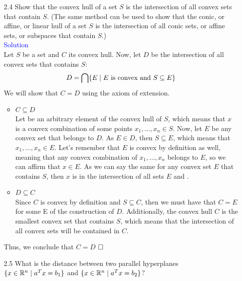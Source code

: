 \documentclass[12pt, oneside]{article}%
\def\R{{\mathbb R}}
\begin{document}
\begin{enumerate}[font=\bfseries]
\item [2.4] Show that the convex hull of a set $S$ is the intersection of all convex sets that contain $S$. (The same method can be used to show that the conic, or affine, or linear hull of a set $S$ is the intersection of all conic sets, or affine sets, or subspaces that contain $S$.)\\

\Large\textsf{\textcolor{blue}{Solution}}
\normalsize\\

Let $S$ be a set and $C$ its convex hull. Now, let $D$ be the intersection of all convex sets that contains $S$:
$$D=\bigcap\{E\hspace{0.1cm}|\hspace{0.1cm}E \text{ is convex and }S\subseteq E\} $$
We will show that $C=D$ using the axiom of extension. 
\begin{itemize}
    \item $C\subseteq D$\\
    Let  be an arbitrary element of the convex hull of $S$, which means that $x$ is a convex combination of some points $x_1, \dots,x_n\in S$. Now, let $E$ be any convex set that belongs to $D$. As $E\in D$, then $S\subseteq E$, which means that $x_1, \dots,x_n\in E$. Let's remember that $E$ is convex by definition as well, meaning that any convex combination of $x_1, \dots,x_n$ belongs to $E$, so we can affirm that $x\in E$. As we can say the same for any convex set $E$ that contains $S$, then $x$ is in the intersection of all sets $E$ and .
    \item $D\subseteq C$\\
    Since $C$ is convex by definition and $S\subseteq C$, then we must have that $C=E$ for some E of the construction of $D$. Additionally, the convex hull $C$ is the smallest convex set that contains $S$, which means that the intersection of all convex sets will be contained in $C$.
\end{itemize}
 Thus, we conclude that $C=D$\newline
    \hspace*{0pt}\hfill $\hfill\square$
\newpage

\item [2.5] What is the distance between two parallel hyperplanes $\{x \in \R^n \hspace{0.1cm} |\hspace{0.1cm} a^T x = b_1\}$ and $\{x \in \R^n \hspace{0.1cm}|\hspace{0.1cm} a^T x = b_2\}$?\\


\end{enumerate}
\end{document}
